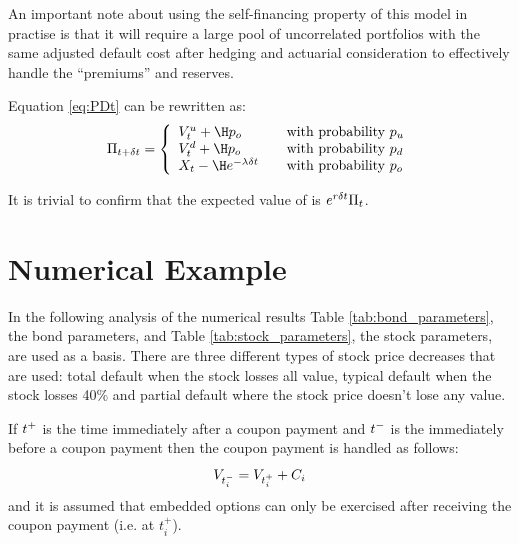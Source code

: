 \documentclass[a4paper,11pt,oneside]{report}
\theoremstyle{plain}
\theoremstyle{definition}
\begin{document}
An important note about using the self-financing property of this model in practise is that it will require a large pool of uncorrelated portfolios with the same adjusted default cost after hedging and actuarial consideration to effectively handle the ``premiums'' and reserves.

Equation \ref{eq:PDt} can be rewritten as:
\begin{equation}
 \PDt = \left\{\begin{array}{l@{\qquad\text{with probability }}l}
                \Vu + \H\po             & \pu \\
                \Vd + \H\po             & \pd \\
                \X - \H e^{-\lambda\Dt} & \po
               \end{array}\right.
\end{equation}

It is trivial to confirm that the expected value of \PDt is $e^{r\delta t}\Pi_t$.



\chapter{Numerical Example}
In the following analysis of the numerical results Table \ref{tab:bond_parameters}, the bond parameters, and Table \ref{tab:stock_parameters}, the stock parameters, are used as a basis.  There are three different types of stock price decreases that are used: total default when the stock losses all value, typical default when the stock losses 40\% and partial default where the stock price doesn't lose any value.

If $t^+$ is the time immediately after a coupon payment and $t^-$ is the immediately before a coupon payment then the coupon payment is handled as follows:
\begin{equation}
 V_{t^{-}_i} = V_{t^{+}_i} + C_i
\end{equation}
and it is assumed that embedded options can only be exercised after receiving the coupon payment (i.e. at $t^{+}_i$).
\end{document}
